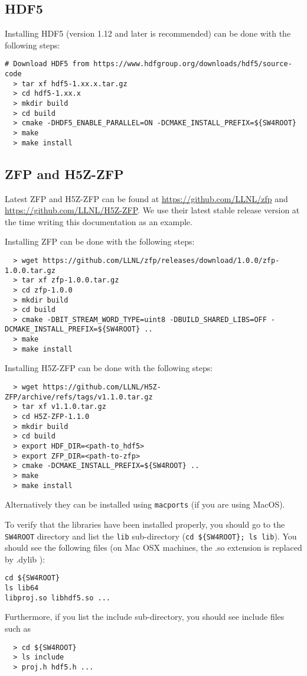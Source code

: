 \documentclass[11pt]{article}
\begin{document}
\subsection{HDF5}
Installing HDF5 (version 1.12 and later is recommended) can be done with the following steps:
\begin{verbatim}
# Download HDF5 from https://www.hdfgroup.org/downloads/hdf5/source-code
  > tar xf hdf5-1.xx.x.tar.gz
  > cd hdf5-1.xx.x
  > mkdir build
  > cd build
  > cmake -DHDF5_ENABLE_PARALLEL=ON -DCMAKE_INSTALL_PREFIX=${SW4ROOT}
  > make
  > make install
\end{verbatim}

\subsection{ZFP and H5Z-ZFP}
Latest ZFP and H5Z-ZFP can be found at \url{https://github.com/LLNL/zfp} and \url{https://github.com/LLNL/H5Z-ZFP}. We use their latest stable release version at the time writing this documentation as an example.

Installing ZFP can be done with the following steps:

\begin{verbatim}
  > wget https://github.com/LLNL/zfp/releases/download/1.0.0/zfp-1.0.0.tar.gz
  > tar xf zfp-1.0.0.tar.gz
  > cd zfp-1.0.0
  > mkdir build
  > cd build
  > cmake -DBIT_STREAM_WORD_TYPE=uint8 -DBUILD_SHARED_LIBS=OFF -DCMAKE_INSTALL_PREFIX=${SW4ROOT} ..
  > make
  > make install
\end{verbatim}

Installing H5Z-ZFP can be done with the following steps:
\begin{verbatim}
  > wget https://github.com/LLNL/H5Z-ZFP/archive/refs/tags/v1.1.0.tar.gz
  > tar xf v1.1.0.tar.gz
  > cd H5Z-ZFP-1.1.0
  > mkdir build
  > cd build
  > export HDF_DIR=<path-to_hdf5>
  > export ZFP_DIR=<path-to-zfp>
  > cmake -DCMAKE_INSTALL_PREFIX=${SW4ROOT} ..
  > make
  > make install
\end{verbatim}

Alternatively they can be installed using {\tt macports} (if you are using MacOS).

To verify that the libraries have been installed properly, you should go to the \verb+SW4ROOT+
directory and list the {\tt lib} sub-directory (\verb+cd ${SW4ROOT}; ls lib+). You should see the
following files (on Mac OSX machines, the .so extension is replaced by .dylib ):
\begin{verbatim}
cd ${SW4ROOT}
ls lib64
libproj.so libhdf5.so ...
\end{verbatim}
Furthermore, if you list the include sub-directory, you should see include files such as 
\begin{verbatim}
  > cd ${SW4ROOT}
  > ls include
  > proj.h hdf5.h ...
\end{verbatim}
\end{document}
